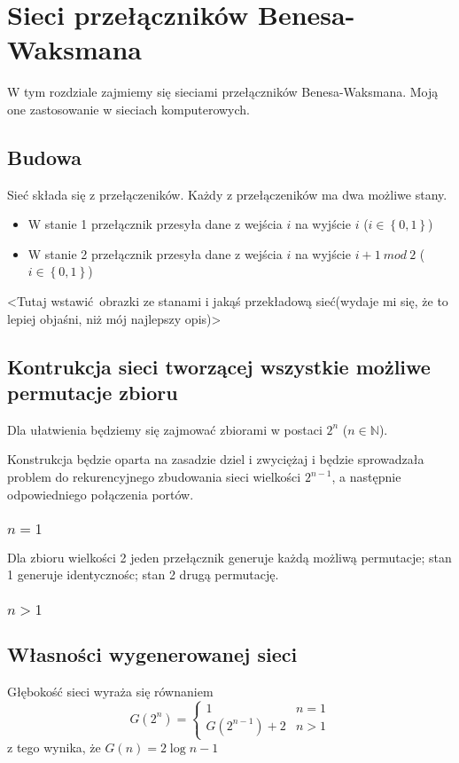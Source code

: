 \section{Sieci przełączników Benesa-Waksmana}

\label{sec:siecibenesa}

W tym rozdziale zajmiemy się sieciami przełączników Benesa-Waksmana. Moją one zastosowanie w sieciach komputerowych.

\subsection{Budowa}
Sieć składa się z przełączeników.
Każdy z przełączeników ma dwa możliwe stany.
\begin{itemize}
  \item W stanie 1 przełącznik przesyła dane z wejścia $i$ na wyjście $i$ ($i \in \left \{ 0, 1 \right \}$)
  \item W stanie 2 przełącznik przesyła dane z wejścia $i$ na wyjście $i + 1~mod~2$ ($i \in \left \{ 0, 1 \right \}$)
\end{itemize}
{\tiny<Tutaj wstawić obrazki ze stanami i jakąś przekładową sieć(wydaje mi się, że to lepiej objaśni, niż mój najlepszy opis)>}

\subsection{Kontrukcja sieci tworzącej wszystkie możliwe permutacje zbioru}
Dla ułatwienia będziemy się zajmować zbiorami w postaci $2^n$ ($n \in \mathbb{N}$).

Konstrukcja będzie oparta na zasadzie dziel i zwyciężaj i będzie sprowadzała problem do rekurencyjnego zbudowania sieci wielkości $2^{n-1}$,
a następnie odpowiedniego połączenia portów.
\subsubsection{$n = 1$}
Dla zbioru wielkości 2 jeden przełącznik generuje każdą możliwą permutacje; stan 1 generuje identycznośc; stan 2 drugą permutację.
\subsubsection{$n > 1$}
{}
\subsection{Własności wygenerowanej sieci}
Głębokość sieci wyraża się równaniem
$$
 G(2^n) = 
  \begin{cases} 
   1 & n = 1 \\
   G(2^{n - 1}) + 2 & n > 1
  \end{cases}
$$
z tego wynika, że $G(n) = 2 \log n - 1$


